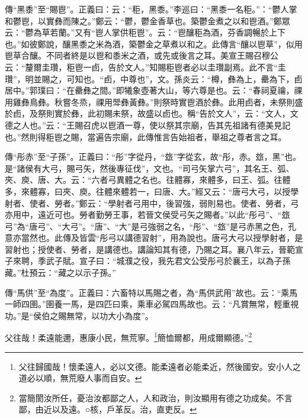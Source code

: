 {\noindent\zhuan{}\fzbyks 傳“黑黍”至“賜鬯”。正義曰：云：“秬，黑黍。”李巡曰：“黑黍一名秬。”：“鬱人掌和鬱鬯，以實彝而陳之。”鄭云：“鬱，鬱金香草也。築鬱金煮之以和鬯酒。”鄭眾云：“鬱為草若蘭。”又有“鬯人掌供秬鬯”。云：“鬯釀秬為酒，芬香調暢於上下也。”如彼鄭說，釀黑黍之米為酒，築鬱金之草煮以和之。此傳言“釀以鬯草”，似用鬯草合釀。不同者終是以鬯和黍米之酒，或先或後言之耳。美宣王賜召穆公云：“釐爾圭瓚，秬鬯一卣，告於文人。”知賜秬鬯者必以圭瓚副焉。此不言“圭瓚”，明並賜之，可知也。“卣，中尊也”，文。孫炎云：“樽，彝為上，罍為下，卣居中。”郭璞曰：“在罍彝之間。”即犧象壺著大山，等六尊是也。云：“春祠夏禴，祼用雞彝鳥彝。秋嘗冬烝，祼用斝彝黃彝。”則祭時實鬯酒於彝。此用卣者，未祭則盛於卣，及祭則實於彝，此初賜未祭，故盛以卣也。稱“告於文人”，云：“文人，文德之人也。”云：“王賜召虎以鬯酒一尊，使以祭其宗廟，告其先祖諸有德美見記也。”然則得秬鬯之賜，當遍告宗廟，此傳惟言告始祖者，舉祖之尊者言之耳。 \par}

{\noindent\zhuan{}\fzbyks 傳“彤赤”至“子孫”。正義曰：“彤”字從丹，“玈”字從玄，故“彤，赤。玈，黑”也。是“諸侯有大弓，賜弓矢，然後專征伐”，文也。“司弓矢掌六弓”，其名王、弧、夾、庾、唐、大。云：“六者弓異體之名也。往體寡，來體多，曰王、弧。往體多，來體寡，曰夾、庾。往體來體若一，曰唐、大。”經又云：“唐弓大弓，以授學射者、使者、勞者。”鄭云：“學射者弓用中，後習強，弱則易也。使者、勞者，弓亦用中，遠近可也。勞者勤勞王事，若晉文侯受弓矢之賜者。”以此“彤弓”、“玈弓”為“唐弓”、“大弓”。“唐”、“大”是弓強弱之名，“彤”、“玈”是弓赤黑之色，孔意亦當然也。此傳及皆雲“彤弓以講德習射”，用為說也。唐弓大弓以授學射者，是習射也；授使者、勞者，是講德也。講論知其有德，乃賜之耳。襄八年云，晉範宣子來聘，季武子賦。宣子曰：“城濮之役，我先君文公受彤弓於襄王，以為子孫藏。”杜預云：“藏之以示子孫。” \par}

{\noindent\zhuan{}\fzbyks 傳“馬供”至“為度”。正義曰：六畜特以馬賜之者，為“馬供武用”故也。云：“乘馬一師四圉。”圉養一馬，是四匹曰乘，乘車必駕四馬故也。云：“凡賞無常，輕重視功。”是“侯伯之賜無常，以功大小為度”。 \par}

父往哉！柔遠能邇，惠康小民，無荒寧。\footnote{父往歸國哉！懷柔遠人，必以文德。能柔遠者必能柔近，然後國安。安小人之道必以順，無荒廢人事而自安。}簡恤爾都，用成爾顯德。”\footnote{當簡閡汝所任，憂治汝都鄙之人，人和政治，則汝顯用有德之功成矣。不言鄙，由近以及遠。○核，戶革反。治，直吏反。}

